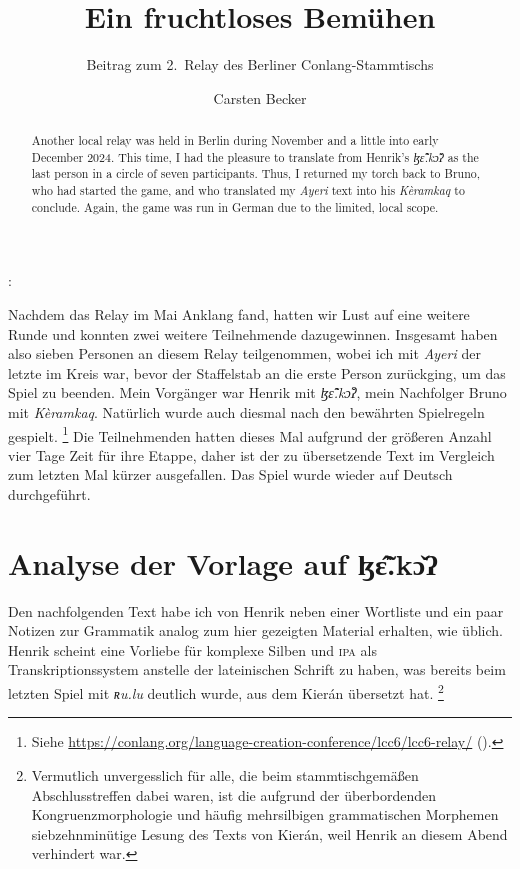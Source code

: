 \documentclass[
	12pt,
	ngerman,
]{scrartcl}
\author{Carsten Becker}
\title{Ein fruchtloses Bemühen}
\subtitle{Beitrag zum 2.~Relay des Berliner Conlang-Stammtischs}
\date{\DTMdate{2024-12-00}} %
\newcommand{\fw}[1]{\textit{#1}} %
\newenvironment{mytitle}{
	\hfill
	\begin{minipage}{0.667\textwidth}
	\vspace{\baselineskip}
	\begin{center}
		\Large
		\sffamily\bfseries
		\makeatletter
}{
		\makeatother
	\end{center}
	\vspace{1em}
	\end{minipage}
	\hfill
}
\newcommand{\Lhengko}{ɮɛ̃̂.kɔ̌ʔ}
\begin{document}

\begin{mytitle}
	\@title: \@subtitle
\end{mytitle}

\begin{abstract}
Another local relay was held in Berlin during November and a little into early
December 2024. This time, I had the pleasure to translate from Henrik's
\emph{\Lhengko} as the last person in a circle of seven participants. Thus, I
returned my torch back to Bruno, who had started the game, and who translated
my \emph{Ayeri} text into his \emph{Kèramkaq} to conclude. Again, the game was
run in German due to the limited, local scope.
\end{abstract}

Nachdem das Relay im Mai Anklang fand, hatten wir Lust auf eine weitere Runde
und konnten zwei weitere Teilnehmende dazugewinnen. Insgesamt haben also sieben
Personen an diesem Relay teilgenommen, wobei ich mit \emph{Ayeri} der letzte im
Kreis war, bevor der Staffelstab an die erste Person zurückging, um das Spiel
zu beenden. Mein Vorgänger war Henrik mit \emph{\Lhengko}, mein Nachfolger
Bruno mit \emph{Kèramkaq}. Natürlich wurde auch diesmal nach den bewährten
Spielregeln gespielt.%
%
	\footnote{Siehe
	\url{https://conlang.org/language-creation-conference/lcc6/lcc6-relay/}
	().}
%
Die Teilnehmenden hatten dieses Mal aufgrund der größeren Anzahl vier Tage Zeit
für ihre Etappe, daher ist der zu übersetzende Text im Vergleich zum letzten
Mal kürzer ausgefallen. Das Spiel wurde wieder auf Deutsch durchgeführt.


\section{Analyse der Vorlage auf \Lhengko}
\label{sec:lhenganalys}

Den nachfolgenden Text habe ich von Henrik neben einer Wortliste und ein paar
Notizen zur Grammatik analog zum hier gezeigten Material erhalten, wie üblich.
Henrik scheint eine Vorliebe für komplexe Silben und \textsc{ipa} als
Transkriptionssystem anstelle der lateinischen Schrift zu haben, was bereits
beim letzten Spiel mit \fw{ʀu.lu} deutlich wurde, aus dem Kierán übersetzt hat.%
%
	\footnote{Vermutlich unvergesslich für alle, die beim stammtischgemäßen
	Abschlusstreffen dabei waren, ist die aufgrund der überbordenden
	Kongruenzmorphologie und häufig mehrsilbigen grammatischen Morphemen
	siebzehn\-minütige Lesung des Texts von Kierán, weil Henrik an diesem Abend
	verhindert war.}
%
\end{document}
